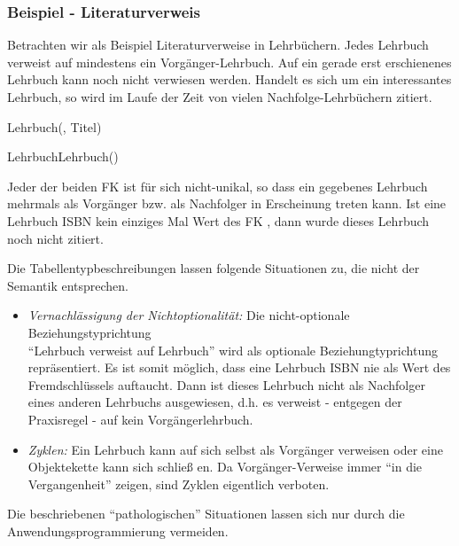 \subsubsection{Beispiel - Literaturverweis}
Betrachten wir als Beispiel Literaturverweise in Lehrbüchern. Jedes Lehrbuch verweist auf mindestens ein Vorgänger-Lehrbuch. Auf ein gerade erst erschienenes Lehrbuch kann noch nicht verwiesen werden. Handelt es sich um ein interessantes Lehrbuch, so wird im Laufe der Zeit von vielen Nachfolge-Lehrbüchern zitiert.
\begin{center}
\end{center}
\begin{small}
    Lehrbuch(, Titel)

    LehrbuchLehrbuch()
\end{small}

Jeder der beiden FK ist für sich nicht-unikal, so dass ein gegebenes Lehrbuch mehrmals als Vorgänger bzw. als Nachfolger in Erscheinung treten kann. Ist eine Lehrbuch ISBN kein einziges Mal Wert des FK , dann wurde dieses Lehrbuch noch nicht zitiert.

Die Tabellentypbeschreibungen lassen folgende Situationen zu, die nicht der Semantik entsprechen.
\begin{itemize}
    \item \textit{Vernachlässigung der Nichtoptionalität:} Die nicht-optionale Beziehungstyprichtung\\ \enquote{Lehrbuch verweist auf Lehrbuch} wird als optionale Beziehungtyprichtung repräsentiert. Es ist somit möglich, dass eine Lehrbuch ISBN nie als Wert des Fremdschlüssels  auftaucht. Dann ist dieses Lehrbuch nicht als Nachfolger eines anderen Lehrbuchs ausgewiesen, d.h. es verweist - entgegen der Praxisregel - auf kein Vorgängerlehrbuch.
    \item \textit{Zyklen:} Ein Lehrbuch kann auf sich selbst als Vorgänger verweisen oder eine Objektekette kann sich schließ en. Da Vorgänger-Verweise immer \enquote{in die Vergangenheit} zeigen, sind Zyklen eigentlich verboten.
\end{itemize}
Die beschriebenen \enquote{pathologischen} Situationen lassen sich nur durch die Anwendungsprogrammierung vermeiden.

